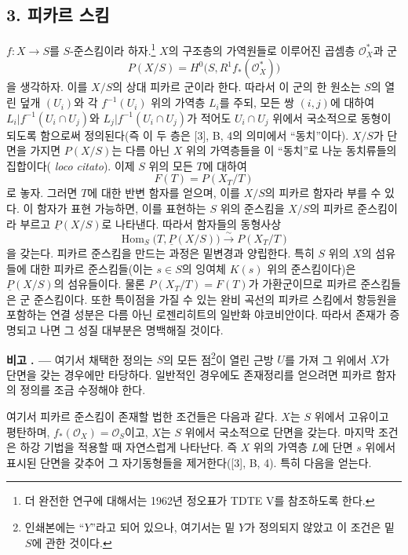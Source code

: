\documentclass[11pt,twoside,openany]{book}
\numberwithin{equation}{section}
\theoremstyle{plain}
\theoremstyle{definition}
\theoremstyle{remark}
\newcommand{\result}[2]{%
  \par\medskip\noindent\textbf{#1%
  \if\relax\detokenize{#2}\relax\else\space#2\fi. ---}\enspace
}
\begin{document}
\subsection*{3. 피카르 스킴}

$f:X\longrightarrow S$를 $S$-준스킴이라 하자.\footnote{더 완전한 연구에
대해서는 1962년 정오표가 TDTE V를 참조하도록 한다.} $X$의 구조층의
가역원들로 이루어진 곱셈층 $\mathcal O_X^*$과 군
\[
  P(X/S)=H^0\bigl(S,R^1f_*(\mathcal O_X^*)\bigr)
\]
을 생각하자. 이를 $X/S$의 상대 피카르 군이라 한다. 따라서 이 군의 한
원소는 $S$의 열린 덮개 $(U_i)$와 각 $f^{-1}(U_i)$ 위의 가역층 $L_i$를
주되, 모든 쌍 $(i,j)$에 대하여
$L_i|f^{-1}(U_i\cap U_j)$와 $L_j|f^{-1}(U_i\cap U_j)$가 적어도
$U_i\cap U_j$ 위에서 국소적으로 동형이 되도록 함으로써 정의된다(즉 이
두 층은 [3], B, 4의 의미에서 ``동치''이다). $X/S$가 단면을 가지면
$P(X/S)$는 다름 아닌 $X$ 위의 가역층들을 이 ``동치''로 나눈 동치류들의
집합이다(
\textit{loco citato}). 이제 $S$ 위의 모든 $T$에 대하여
\[
  F(T)=P(X_T/T)
\]
로 놓자. 그러면 $T$에 대한 반변 함자를 얻으며, 이를 $X/S$의 피카르
함자라 부를 수 있다. 이 함자가 표현 가능하면, 이를 표현하는 $S$ 위의
준스킴을 $X/S$의 피카르 준스킴이라 부르고 $\underline P(X/S)$로 나타낸다.
따라서 함자들의 동형사상
\[
  \operatorname{Hom}_S\bigl(T,\underline P(X/S)\bigr)
  \xrightarrow{\sim}P(X_T/T)
\]
을 갖는다. 피카르 준스킴을 만드는 과정은 밑변경과 양립한다. 특히 $S$
위의 $X$의 섬유들에 대한 피카르 준스킴들(이는 $s\in S$의 잉여체
$K(s)$ 위의 준스킴이다)은 $\underline P(X/S)$의 섬유들이다. 물론
$P(X_T/T)=F(T)$가 가환군이므로 피카르 준스킴들은 군 준스킴이다. 또한
특이점을 가질 수 있는 완비 곡선의 피카르 스킴에서 항등원을 포함하는 연결
성분은 다름 아닌 로젠리히트의 일반화 야코비안이다. 따라서 존재가 증명되고
나면 그 성질 대부분은 명백해질 것이다.

\result{비고}{} 여기서 채택한 정의는 $S$의 모든 점\footnote{인쇄본에는
``$Y$''라고 되어 있으나, 여기서는 밑 $Y$가 정의되지 않았고 이 조건은 밑
$S$에 관한 것이다.}이 열린 근방 $U$를 가져 그 위에서 $X$가 단면을 갖는
경우에만 타당하다. 일반적인 경우에도 존재정리를 얻으려면 피카르 함자의
정의를 조금 수정해야 한다.

여기서 피카르 준스킴이 존재할 법한 조건들은 다음과 같다. $X$는 $S$
위에서 고유이고 평탄하며, $f_*(\mathcal O_X)=\mathcal O_S$이고, $X$는
$S$ 위에서 국소적으로 단면을 갖는다. 마지막 조건은 하강 기법을 적용할 때
자연스럽게 나타난다. 즉 $X$ 위의 가역층 $L$에 단면 $s$ 위에서 표시된
단면을 갖추어 그 자기동형들을 제거한다([3], B, 4). 특히 다음을 얻는다.
\end{document}
